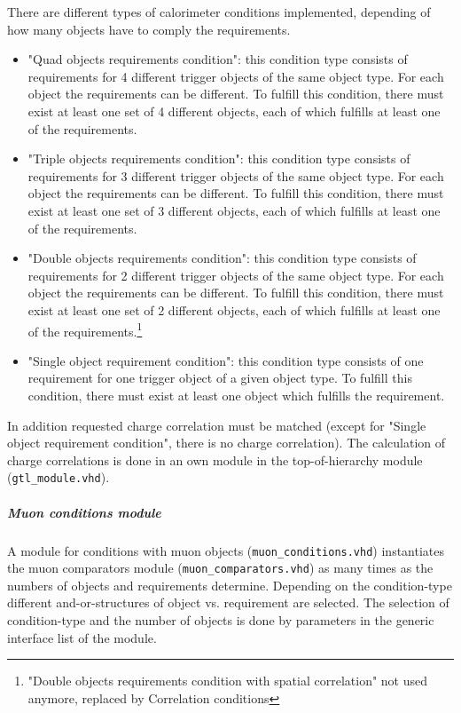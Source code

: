 There are different types of calorimeter conditions implemented, depending of how many objects have to comply the requirements.
\begin{itemize}
\item "Quad objects requirements condition": this condition type consists of requirements for 4 different trigger objects of the same object type. 
For each object the requirements can be different. To fulfill this condition, there must exist at least one set of 4 different objects,
each of which fulfills at least one of the requirements.
\item "Triple objects requirements condition": this condition type consists of requirements for 3 different trigger objects of the same object type. 
For each object the requirements can be different. To fulfill this condition, there must exist at least one set of 3 different objects,
each of which fulfills at least one of the requirements.
\item "Double objects requirements condition": this condition type consists of requirements for 2 different trigger objects of the same object type. 
For each object the requirements can be different. To fulfill this condition, there must exist at least one set of 2 different objects,
each of which fulfills at least one of the requirements.\footnote{"Double objects requirements condition with spatial correlation" not used anymore, replaced by Correlation conditions}
\item "Single object requirement condition": this condition type consists of one requirement for one trigger object of a given object type. 
To fulfill this condition, there must exist at least one object which fulfills the requirement.

\end{itemize}

In addition requested charge correlation must be matched (except for "Single object requirement condition", there is no charge correlation).
The calculation of charge correlations is done in an own module in the top-of-hierarchy module (\texttt{gtl\_module.vhd}).\\

\subparagraph{Muon conditions module}
A module for conditions with muon objects (\texttt{muon\_conditions.vhd}) instantiates the muon comparators module (\texttt{muon\_comparators.vhd}) as many times as
the numbers of objects and requirements determine. Depending on the condition-type different and-or-structures of object vs. requirement are selected.
The selection of condition-type and the number of objects is done by parameters in the generic interface list of the module.

